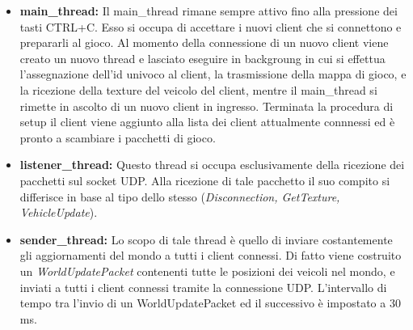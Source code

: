 \documentclass{article}
\begin{document}
\begin{itemize}
\item{\textbf{main\_thread:}}
Il main\_thread rimane sempre attivo fino alla pressione dei tasti CTRL+C. Esso si occupa di accettare i nuovi client che si connettono e prepararli al gioco. Al momento della connessione di un nuovo client viene creato un nuovo thread e lasciato eseguire in backgroung in cui si effettua l'assegnazione dell'id univoco al client, la trasmissione della mappa di gioco, e la ricezione della texture del veicolo del client, mentre il main\_thread si rimette in ascolto di un nuovo client in ingresso. Terminata la procedura di setup il client viene aggiunto alla lista dei client attualmente connnessi ed è pronto a scambiare i pacchetti di gioco.
\item{\textbf{listener\_thread:}}
Questo thread si occupa esclusivamente della ricezione dei pacchetti sul socket UDP. Alla ricezione di tale pacchetto il suo compito si differisce in base al tipo dello stesso (\textit{Disconnection, GetTexture, VehicleUpdate}).
\item{\textbf{sender\_thread:}}
Lo scopo di tale thread è quello di inviare costantemente gli aggiornamenti del mondo a tutti i client connessi. Di fatto viene costruito un \textit{WorldUpdatePacket} contenenti tutte le posizioni dei veicoli nel mondo, e inviati a tutti i client connessi tramite la connessione UDP. L'intervallo di tempo tra l'invio di un WorldUpdatePacket ed il successivo è impostato a 30 ms.
\end{itemize}
\end{document}
